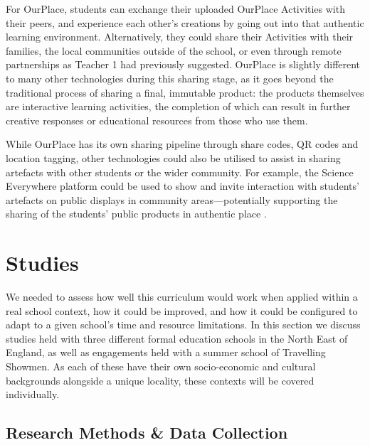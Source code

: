 For OurPlace, students can exchange their uploaded OurPlace Activities with their peers, and experience each other's creations by going out into that authentic learning environment. Alternatively, they could share their Activities with their families, the local communities outside of the school, or even through remote partnerships as Teacher 1 had previously suggested. OurPlace is slightly different to many other technologies during this sharing stage, as it goes beyond the traditional process of sharing a final, immutable product: the products themselves are interactive learning activities, the completion of which can result in further creative responses or educational resources from those who use them. 

While OurPlace has its own sharing pipeline through share codes, QR codes and location tagging, other technologies could also be utilised to assist in sharing artefacts with other students or the wider community. For example, the Science Everywhere platform could be used to show and invite interaction with students' artefacts on public displays in community areas---potentially supporting the sharing of the students' public products in authentic place \citep{ahn2018}.

\section{Studies}

We needed to assess how well this curriculum would work when applied within a real school context, how it could be improved, and how it could be configured to adapt to a given school's time and resource limitations. In this section we discuss studies held with three different formal education schools in the North East of England, as well as engagements held with a summer school of Travelling Showmen. As each of these have their own socio-economic and cultural backgrounds alongside a unique locality, these contexts will be covered individually.

\subsection{Research Methods \& Data Collection}

